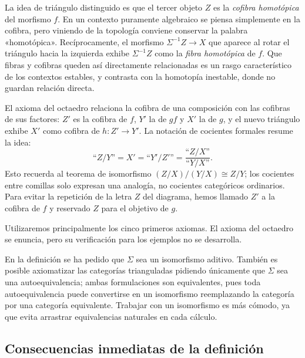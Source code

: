 \begin{obs}
La idea de triángulo distinguido es que el tercer objeto $Z$ es la \emph{cofibra homotópica} del morfismo $f$. En un contexto puramente algebraico se piensa simplemente en la cofibra, pero viniendo de la topología conviene conservar la palabra «homotópica». Recíprocamente, el morfismo $\Sigma^{-1}Z\to X$ que aparece al rotar el triángulo hacia la izquierda exhibe $\Sigma^{-1}Z$ como la \emph{fibra homotópica} de $f$. Que fibras y cofibras queden así directamente relacionadas es un rasgo característico de los contextos estables, y contrasta con la homotopía inestable, donde no guardan relación directa.

El axioma del octaedro relaciona la cofibra de una composición con las cofibras de sus factores: $Z'$ es la cofibra de $f$, $Y'$ la de $gf$ y $X'$ la de $g$, y el nuevo triángulo exhibe $X'$ como cofibra de $h\colon Z'\to Y'$. La notación de cocientes formales resume la idea:
\[
\text{``}Z/Y\text{''}=X'
=\text{``}Y'/Z'\text{''}
=\frac{\text{``}Z/X\text{''}}{\text{``}Y/X\text{''}}.
\]
Esto recuerda al teorema de isomorfismo $(Z/X)/(Y/X)\cong Z/Y$; los cocientes entre comillas solo expresan una analogía, no cocientes categóricos ordinarios. Para evitar la repetición de la letra $Z$ del diagrama, hemos llamado $Z'$ a la cofibra de $f$ y reservado $Z$ para el objetivo de $g$.
\end{obs}

\begin{nota}
   Utilizaremos principalmente los cinco primeros axiomas. El axioma del octaedro se enuncia, pero su verificación para los ejemplos no se desarrolla.
\end{nota}

\begin{nota}
   En la definición se ha pedido que $\Sigma$ sea un isomorfismo aditivo. También es posible axiomatizar las categorías trianguladas pidiendo únicamente que $\Sigma$ sea una autoequivalencia; ambas formulaciones son equivalentes, pues toda autoequivalencia puede convertirse en un isomorfismo reemplazando la categoría por una categoría equivalente. Trabajar con un isomorfismo es más cómodo, ya que evita arrastrar equivalencias naturales en cada cálculo.
\end{nota}

\subsection{Consecuencias inmediatas de la definición}

